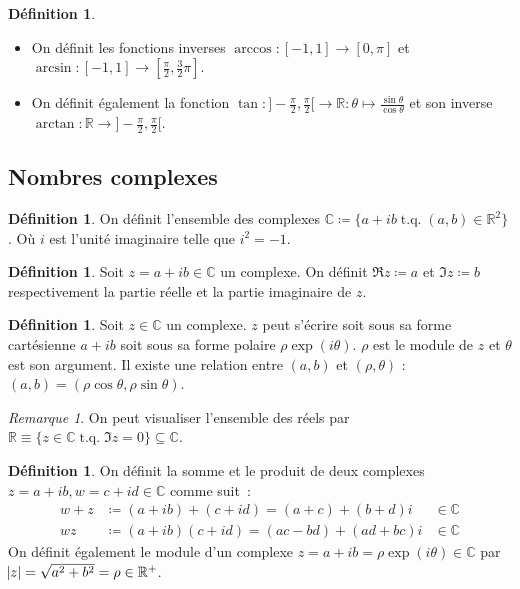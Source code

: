 \documentclass{article}
\DeclareMathOperator{\tq}{\text{ t.q. }}
\newcommand{\R}{\mathbb R}
\newcommand{\C}{\mathbb C}
\renewcommand{\interval}[2]{\left[#1, #2\right]}
\theoremstyle{definition}
\newtheorem{déf}[thm]{Définition}
\theoremstyle{remark}
\newtheorem*{rmq}{Remarque}
\begin{document}
		\begin{déf}~
		\begin{itemize}
			\item On définit les fonctions inverses $\arccos : \interval {-1}1 \to \interval 0\pi$ et $\arcsin : \interval {-1}1 \to \interval {\frac \pi2}{\frac 32\pi}$.
			\item On définit également la fonction $\tan : ]-\frac \pi2, \frac \pi2[ \to \R : \theta \mapsto \frac {\sin\theta}{\cos\theta}$ et son inverse
			      $\arctan : \R \to ]-\frac \pi2, \frac \pi2[$.
		\end{itemize}
		\end{déf}

	\subsection{Nombres complexes}
		\begin{déf} On définit l'ensemble des complexes $\C \coloneqq \{a + ib \tq (a, b) \in \R^2\}$. Où $i$ est l'unité imaginaire telle que $i^2 = -1$. \end{déf}

		\begin{déf} Soit $z = a + ib \in \C$ un complexe. On définit $\Re z \coloneqq a$ et $\Im z \coloneqq b$ respectivement la partie réelle et la partie
		imaginaire de $z$. \end{déf}

		\begin{déf} Soit $z \in \C$ un complexe. $z$ peut s'écrire soit sous sa forme cartésienne $a + ib$ soit sous sa forme polaire $\rho \exp(i\theta)$. $\rho$
		est le module de $z$ et $\theta$ est son argument. Il existe une relation entre $(a, b)$ et $(\rho, \theta)$ : $(a, b) = (\rho\cos\theta, \rho\sin\theta)$.
		\end{déf}

		\begin{rmq} On peut visualiser l'ensemble des réels par $\R \equiv \{z \in \C \tq \Im z = 0\} \subseteq \C$. \end{rmq}

		\begin{déf} On définit la somme et le produit de deux complexes $z = a+ib, w = c + id \in \C$ comme suit~:
		\begin{align*}
			w+z &\coloneqq (a+ib) + (c+id) = (a+c) + (b+d)i &\in \C \\
			w z &\coloneqq (a+ib)(c+id) = (ac - bd) + (ad+bc)i &\in \C
		\end{align*}
		On définit également le module d'un complexe $z = a+ib = \rho\exp(i\theta) \in \C$ par $\abs z = \sqrt {a^2+b^2} = \rho \in \R^+$. \end{déf}
\end{document}
